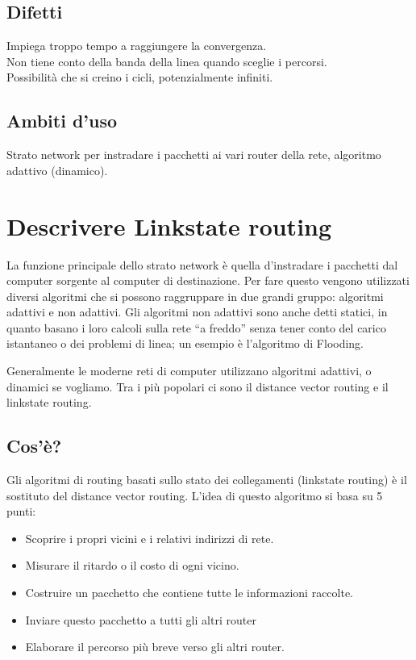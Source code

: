 \subsection{Difetti}
Impiega troppo tempo a raggiungere la convergenza.\\
Non tiene conto della banda della linea quando sceglie i percorsi.\\
Possibilità che si creino i cicli, potenzialmente infiniti.

\subsection{Ambiti d'uso}
Strato network per instradare i pacchetti ai vari router della rete, algoritmo adattivo (dinamico).

\section{Descrivere Linkstate routing}

La funzione principale dello strato network è quella d'instradare i pacchetti dal computer sorgente al computer di destinazione. Per fare questo vengono utilizzati diversi algoritmi che si possono raggruppare in due grandi gruppo: algoritmi adattivi e non adattivi. Gli algoritmi non adattivi sono anche detti statici, in quanto basano i loro calcoli sulla rete “a freddo” senza tener conto del carico istantaneo o dei problemi di linea; un esempio è l'algoritmo di Flooding.

Generalmente le moderne reti di computer utilizzano algoritmi adattivi, o dinamici se vogliamo. Tra i più popolari ci sono il distance vector routing e il linkstate routing.
\subsection{Cos'è?}
Gli algoritmi di routing basati sullo stato dei collegamenti (linkstate routing) è il sostituto del distance vector routing. L'idea di questo algoritmo si basa su 5 punti:
\begin{itemize}
\item	Scoprire i propri vicini e i relativi indirizzi di rete.
\item	Misurare il ritardo o il costo di ogni vicino.
\item	Costruire un pacchetto che contiene tutte le informazioni raccolte.
\item	Inviare questo pacchetto a tutti gli altri router
\item	Elaborare il percorso più breve verso gli altri router.
\end{itemize}

